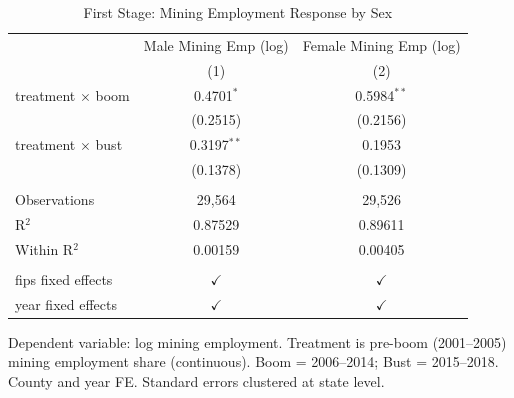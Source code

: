 
\begin{table}[htbp]
   \caption{\label{tab:first_stage} First Stage: Mining Employment Response by Sex}
   \bigskip
   \centering
   \begin{tabular}{lcc}
      \toprule
                               & Male Mining Emp (log) & Female Mining Emp (log) \\   
                               & (1)                   & (2)\\  
      \midrule 
      treatment $\times$ boom  & 0.4701$^{*}$          & 0.5984$^{**}$\\   
                               & (0.2515)              & (0.2156)\\   
      treatment $\times$ bust  & 0.3197$^{**}$         & 0.1953\\   
                               & (0.1378)              & (0.1309)\\   
       \\
      Observations             & 29,564                & 29,526\\  
      R$^2$                    & 0.87529               & 0.89611\\  
      Within R$^2$             & 0.00159               & 0.00405\\  
       \\
      fips fixed effects       & $\checkmark$          & $\checkmark$\\   
      year fixed effects       & $\checkmark$          & $\checkmark$\\   
      \bottomrule
   \end{tabular}
   
   \par \raggedright 
   Dependent variable: log mining employment. Treatment is pre-boom (2001--2005) mining employment share (continuous). Boom = 2006--2014; Bust = 2015--2018. County and year FE. Standard errors clustered at state level.
\end{table}



